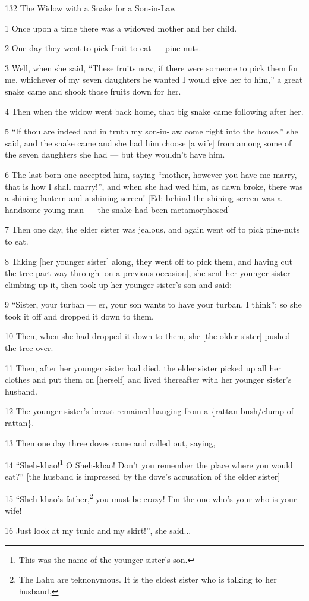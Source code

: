 
132 The Widow with a Snake for a Son-in-Law

1 Once upon a time there was a widowed mother and her child.

2 One day they went to pick fruit to eat --- pine-nuts.

3 Well, when she said, ``These fruits now, if there were someone to pick them for
me, whichever of my seven daughters he wanted I would give her to him,'' a great
snake came and shook those fruits down for her.

4 Then when the widow went back home, that big snake came following after her.

5 ``If thou are indeed and in truth my son-in-law come right into the house,''
she said, and the snake came and she had him choose [a wife] from among some of
the seven daughters she had --- but they wouldn't have him.

6 The last-born one accepted him, saying ``mother, however you have me marry, that
is how I shall marry!'', and when she had wed him, as dawn broke, there was a shining
lantern and a shining screen! [Ed: behind the shining screen was a handsome young
man --- the snake had been metamorphosed]

7 Then one day, the elder sister was jealous, and again went off to pick pine-nuts
to eat.

8 Taking [her younger sister] along, they went off to pick them, and having cut
the tree part-way through [on a previous occasion], she sent her younger sister
climbing up it, then took up her younger sister's son and said:

9 ``Sister, your turban --- er, your son wants to have your turban, I think'';
so she took it off and dropped it down to them.

10 Then, when she had dropped it down to them, she [the older sister] pushed the
tree over.

11 Then, after her younger sister had died, the elder sister picked up all her
clothes and put them on [herself] and lived thereafter with her younger sister's
husband.

12 The younger sister's breast remained hanging from a \{rattan bush/clump of rattan\}.

13 Then one day three doves came and called out, saying,

14 ``Sheh-khao!\footnote{This was the name of the younger sister's son.} O Sheh-khao! Don't you remember the place where you would eat?''
[the husband is impressed by the dove's accusation of the elder sister]

15 ``Sheh-khao's father,\footnote{The Lahu are teknonymous. It is the eldest sister who is talking to her husband,} you must be crazy! I'm the one who's your who is your
wife!

16 Just look at my tunic and my skirt!'', she said...

